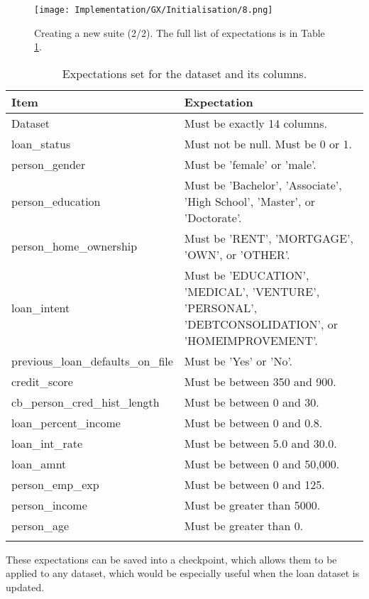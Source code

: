 \begin{figure}[H]
    \centering
    \texttt{[image: Implementation/GX/Initialisation/8.png]}
    \caption{Creating a new suite (2/2). The full list of expectations is in Table \ref{tab:Expectations}.}
    \label{fig:GXSuite2}
\end{figure}

\begin{longtable}{ | p{} | p{} |}
    \hline
    \cellcolor{blue!25}Item & \cellcolor{blue!25}Expectation\\
    \hline
    Dataset & Must be exactly 14 columns. \\
    \hline
    loan\_status & Must not be null. \newline Must be 0 or 1. \\
    \hline 
    person\_gender & Must be 'female' or 'male'. \\
    \hline 
    person\_education & Must be 'Bachelor', 'Associate', 'High School', 'Master', or 'Doctorate'. \\
    \hline
    person\_home\_ownership & Must be 'RENT', 'MORTGAGE', 'OWN', or 'OTHER'.\\
    \hline 
    loan\_intent & Must be 'EDUCATION', 'MEDICAL', 'VENTURE', 'PERSONAL', 'DEBTCONSOLIDATION', or 'HOMEIMPROVEMENT'.\\
    \hline 
    previous\_loan\_defaults\_on\_file & Must be 'Yes' or 'No'. \\
    \hline
    credit\_score & Must be between 350 and 900. \\
    \hline
    cb\_person\_cred\_hist\_length & Must be between 0 and 30. \\
    \hline
    loan\_percent\_income & Must be between 0 and 0.8. \\
    \hline
    loan\_int\_rate & Must be between 5.0 and 30.0. \\
    \hline
    loan\_amnt & Must be between 0 and 50,000. \\
    \hline 
    person\_emp\_exp & Must be between 0 and 125. \\
    \hline 
    person\_income & Must be greater than 5000. \\
    \hline 
    person\_age & Must be greater than 0. \\
    \hline
\caption{Expectations set for the dataset and its columns.}\label{tab:Expectations}
\end{longtable}

\para These expectations can be saved into a checkpoint, which allows them to be applied to any dataset, which would be especially 
useful when the loan dataset is updated.

